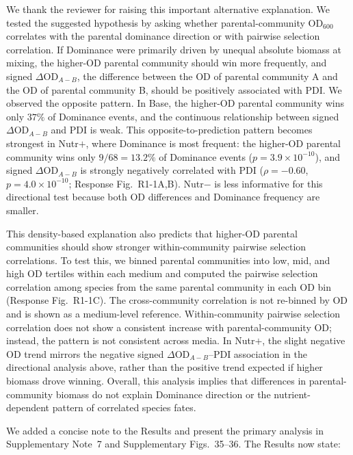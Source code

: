 \responselabel
We thank the reviewer for raising this important alternative explanation. We tested the suggested hypothesis by asking whether parental-community OD$_{600}$ correlates with the parental dominance direction or with pairwise selection correlation.
If Dominance were primarily driven by unequal absolute biomass at mixing, the higher-OD parental community should win more frequently, and signed $\Delta\text{OD}_{A-B}$, the difference between the OD of parental community A and the OD of parental community B, should be positively associated with PDI. We observed the opposite pattern. In Base, the higher-OD parental community wins only $37\%$ of Dominance events, and the continuous relationship between signed $\Delta\text{OD}_{A-B}$ and PDI is weak. This opposite-to-prediction pattern becomes strongest in Nutr$+$, where Dominance is most frequent: the higher-OD parental community wins only $9/68 = 13.2\%$ of Dominance events ($p = 3.9 \times 10^{-10}$), and signed $\Delta\text{OD}_{A-B}$ is strongly negatively correlated with PDI ($\rho = -0.60$, $p = 4.0 \times 10^{-10}$; Response Fig.~R1-1A,B). Nutr$-$ is less informative for this directional test because both OD differences and Dominance frequency are smaller.

This density-based explanation also predicts that higher-OD parental communities should show stronger within-community pairwise selection correlations. To test this, we binned parental communities into low, mid, and high OD tertiles within each medium and computed the pairwise selection correlation among species from the same parental community in each OD bin (Response Fig.~R1-1C). The cross-community correlation is not re-binned by OD and is shown as a medium-level reference. Within-community pairwise selection correlation does not show a consistent increase with parental-community OD; instead, the pattern is not consistent across media. In Nutr$+$, the slight negative OD trend mirrors the negative signed $\Delta\text{OD}_{A-B}$--PDI association in the directional analysis above, rather than the positive trend expected if higher biomass drove winning. Overall, this analysis implies that differences in parental-community biomass do not explain Dominance direction or the nutrient-dependent pattern of correlated species fates.

We added a concise note to the Results and present the primary analysis in Supplementary Note~7 and Supplementary Figs.~35--36. The Results now state: 

